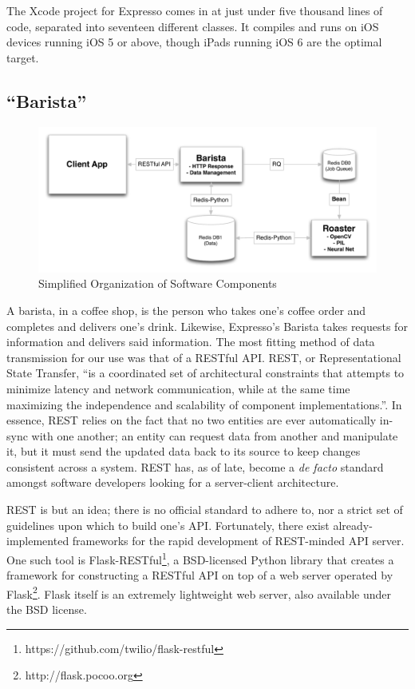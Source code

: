 \documentclass{acm_proc_article-sp}
\begin{document}
The Xcode project for Expresso comes in at just under five thousand lines of code, separated into seventeen different classes. It compiles and runs on iOS devices running iOS 5 or above, though iPads running iOS 6 are the optimal target.

\subsection{``Barista''}

\begin{figure}
\centering
\includegraphics[width=1.0\textwidth]{final_chart.pdf}
\caption{Simplified Organization of Software Components}
\label{fig:final_chart}
\end{figure}

A barista, in a coffee shop, is the person who takes one's coffee order and completes and delivers one's drink. Likewise, Expresso's Barista takes requests for information and delivers said information. The most fitting method of data transmission for our use was that of a RESTful API. REST, or Representational State Transfer, ``is a coordinated set of architectural constraints that attempts to minimize latency and network communication, while at the same time maximizing the independence and scalability of component implementations.''\cite{Fielding:2002:PDM:514183.514185}. In essence, REST relies on the fact that no two entities are ever automatically in-sync with one another; an entity can request data from another and manipulate it, but it must send the updated data back to its source to keep changes consistent across a system. REST has, as of late, become a \emph{de facto} standard amongst software developers looking for a server-client architecture. 

REST is but an idea; there is no official standard to adhere to, nor a strict set of guidelines upon which to build one's API. Fortunately, there exist already-implemented frameworks for the rapid development of REST-minded API server. One such tool is Flask-RESTful\footnote{https://github.com/twilio/flask-restful}, a BSD-licensed Python library that creates a framework for constructing a RESTful API on top of a web server operated by Flask\footnote{http://flask.pocoo.org}. Flask itself is an extremely lightweight web server, also available under the BSD license.
\end{document}
